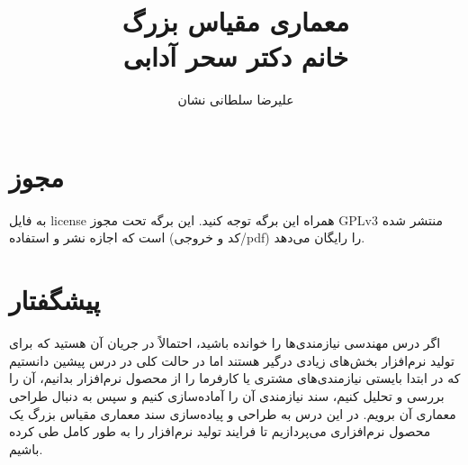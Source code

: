 \documentclass[a4paper]{article}
\title{معماری مقیاس بزرگ \\ خانم دکتر سحر آدابی}
\author{علیرضا سلطانی نشان}
\begin{document}
\maketitle
\tableofcontents

\section*{مجوز}

به فایل license همراه این برگه توجه کنید. این برگه تحت مجوز GPLv3 منتشر شده است
که اجازه نشر و استفاده (کد و خروجی/pdf) را رایگان می‌دهد.

\section{پیشگفتار}

اگر درس مهندسی نیازمندی‌ها را خوانده باشید، احتمالاً در جریان آن هستید که برای
تولید نرم‌افزار بخش‌های زیادی درگیر هستند اما در حالت کلی در درس پیشین دانستیم
که در ابتدا بایستی نیازمندی‌های مشتری یا کارفرما را از محصول نرم‌افزار بدانیم،
آن را بررسی و تحلیل کنیم، سند نیازمندی آن را آماده‌سازی کنیم و سپس به دنبال
طراحی معماری آن برویم. در این درس به طراحی و پیاده‌سازی سند معماری مقیاس بزرگ یک
محصول نرم‌افزاری می‌پردازیم تا فرایند تولید نرم‌افزار را به طور کامل طی کرده
باشیم.






\newpage


\end{document}
